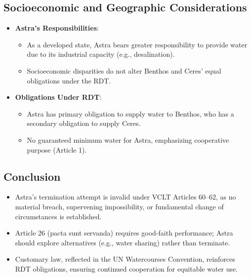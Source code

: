 \subsection{Socioeconomic and Geographic Considerations}
\begin{itemize}
    \item \textbf{Astra’s Responsibilities}:
    \begin{itemize}
        \item As a developed state, Astra bears greater responsibility to provide water due to its industrial capacity (e.g., desalination).
        \item Socioeconomic disparities do not alter Benthos and Ceres’ equal obligations under the RDT.
    \end{itemize}
    \item \textbf{Obligations Under RDT}:
    \begin{itemize}
        \item Astra has primary obligation to supply water to Benthos, who has a secondary obligation to supply Ceres.
        \item No guaranteed minimum water for Astra, emphasizing cooperative purpose (Article 1).
    \end{itemize}
\end{itemize}

\subsection{Conclusion}
\begin{itemize}
    \item Astra’s termination attempt is invalid under VCLT Articles 60–62, as no material breach, supervening impossibility, or fundamental change of circumstances is established.
    \item Article 26 (pacta sunt servanda) requires good-faith performance; Astra should explore alternatives (e.g., water sharing) rather than terminate.
    \item Customary law, reflected in the UN Watercourses Convention, reinforces RDT obligations, ensuring continued cooperation for equitable water use.
\end{itemize}

